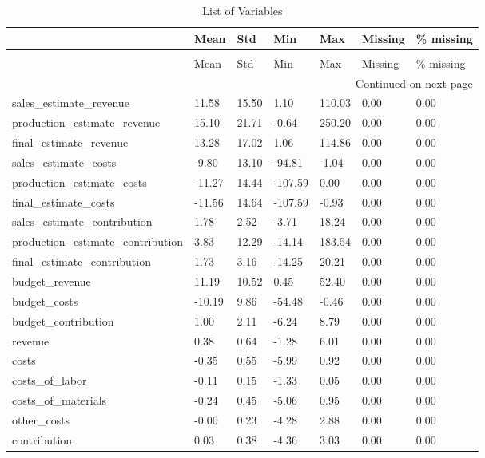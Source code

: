 \begin{landscape}\begin{longtable}[h!]{lllllll}
\caption{List of Variables} \label{eda_1} \\
\toprule
 & Mean & Std & Min & Max & Missing & \% missing \\
\midrule
\endfirsthead
\caption[]{List of Variables} \\
\toprule
 & Mean & Std & Min & Max & Missing & \% missing \\
\midrule
\endhead
\midrule
\multicolumn{7}{r}{Continued on next page} \\
\midrule
\endfoot
\bottomrule
\endlastfoot
sales_estimate_revenue & 11.58 & 15.50 & 1.10 & 110.03 & 0.00 & 0.00 \\
production_estimate_revenue & 15.10 & 21.71 & -0.64 & 250.20 & 0.00 & 0.00 \\
final_estimate_revenue & 13.28 & 17.02 & 1.06 & 114.86 & 0.00 & 0.00 \\
sales_estimate_costs & -9.80 & 13.10 & -94.81 & -1.04 & 0.00 & 0.00 \\
production_estimate_costs & -11.27 & 14.44 & -107.59 & 0.00 & 0.00 & 0.00 \\
final_estimate_costs & -11.56 & 14.64 & -107.59 & -0.93 & 0.00 & 0.00 \\
sales_estimate_contribution & 1.78 & 2.52 & -3.71 & 18.24 & 0.00 & 0.00 \\
production_estimate_contribution & 3.83 & 12.29 & -14.14 & 183.54 & 0.00 & 0.00 \\
final_estimate_contribution & 1.73 & 3.16 & -14.25 & 20.21 & 0.00 & 0.00 \\
budget_revenue & 11.19 & 10.52 & 0.45 & 52.40 & 0.00 & 0.00 \\
budget_costs & -10.19 & 9.86 & -54.48 & -0.46 & 0.00 & 0.00 \\
budget_contribution & 1.00 & 2.11 & -6.24 & 8.79 & 0.00 & 0.00 \\
revenue & 0.38 & 0.64 & -1.28 & 6.01 & 0.00 & 0.00 \\
costs & -0.35 & 0.55 & -5.99 & 0.92 & 0.00 & 0.00 \\
costs_of_labor & -0.11 & 0.15 & -1.33 & 0.05 & 0.00 & 0.00 \\
costs_of_materials & -0.24 & 0.45 & -5.06 & 0.95 & 0.00 & 0.00 \\
other_costs & -0.00 & 0.23 & -4.28 & 2.88 & 0.00 & 0.00 \\
contribution & 0.03 & 0.38 & -4.36 & 3.03 & 0.00 & 0.00 \\

\end{longtable}
\end{landscape}
